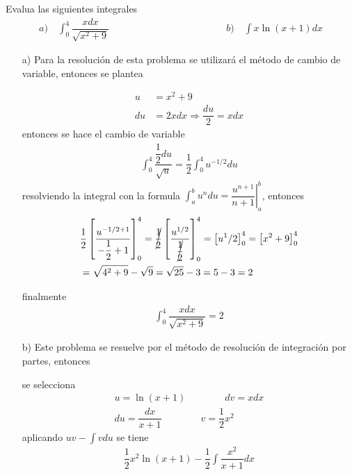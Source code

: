 \documentclass[legalpaper, 12pt]{exam}
\begin{document}
\begin{questions}
\question Evalua las siguientes integrales
\begin{align*}
a)\quad\int_{0}^4 \dfrac{xdx}{\sqrt{x^2 + 9}}\qquad\qquad\qquad\qquad\qquad\qquad b)\quad\int x\ln{(x+1)}dx
\end{align*}
 \vspace{0.15in}
 \begin{solution}
 \begin{itemize}
 \item[a)] Para la resolución de esta problema se utilizará el método de cambio de variable, entonces se plantea
\begin{multicols}{2}
 \begin{align*}
 u &= x^2 + 9\\
 du &= 2xdx \Rightarrow \dfrac{du}{2} = xdx
 \end{align*}
 entonces se hace el cambio de variable
 \begin{align*}
 \int_0^4 \dfrac{\dfrac{1}{2}du}{\sqrt{u}} = \dfrac{1}{2}\int_0^4 u^{-1/2} du
 \end{align*}
 resolviendo la integral con la formula $\int_a^b u^n du = \left.\dfrac{u^{n+1}}{n+1}\right|_a^b$, entonces
 \begin{align*}
 &\dfrac{1}{2}\left[\dfrac{u^{-1/2+1}}{-\dfrac{1}{2}+1}\right]_0^4 = \cancel{\dfrac{1}{2}}\left[\dfrac{u^{1/2}}{\cancel{\dfrac{1}{2}}}\right]_0^4 = \left[u^1/2\right]_0^4 = \left[x^2 + 9\right]_0^4\\
 &= \sqrt{4^2 + 9} - \sqrt{9} = \sqrt{25} - 3 = 5-3 = 2
 \end{align*}
\end{multicols}
finalmente
\begin{align*}
\int_{0}^4 \dfrac{xdx}{\sqrt{x^2 + 9}} = 2
\end{align*}
\item[b)] Este problema se resuelve por el método de resolución de integración por partes, entonces
\begin{multicols}{2}
se selecciona
\begin{align*}
u = \ln{(x+1)}\qquad\qquad dv = xdx\\
du = \dfrac{dx}{x+1}\qquad\qquad v = \dfrac{1}{2}x^2
\end{align*}
aplicando $uv - \int vdu$ se tiene
\begin{align}
\dfrac{1}{2}x^2\ln{(x+1)} - \dfrac{1}{2}\int \dfrac{x^2}{x+1} dx
\end{align}
\end{multicols}

\end{itemize}
\end{solution}
\end{questions}
\end{document}
